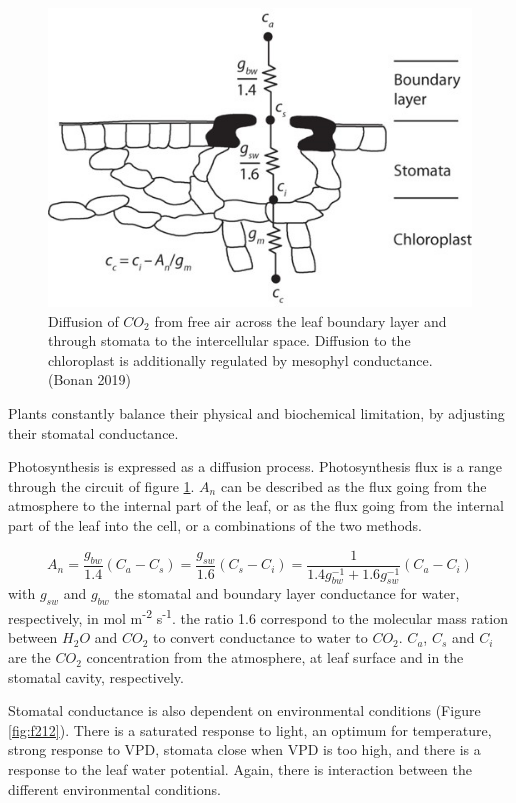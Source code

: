\documentclass[
  12pt,
  oneside]{book}
\begin{document}
\begin{figure}

{\centering \includegraphics[width=0.8\linewidth]{figures/chap2/conductance} 

}

\caption{Diffusion of $CO_2$ from free air across the leaf boundary layer and through stomata to the intercellular space. Diffusion to the chloroplast is additionally regulated by mesophyl conductance. (Bonan 2019)}\label{fig:f211}
\end{figure}

Plants constantly balance their physical and biochemical limitation, by adjusting their stomatal conductance.

Photosynthesis is expressed as a diffusion process. Photosynthesis flux is a range through the circuit of figure \ref{fig:f211}. \(A_n\) can be described as the flux going from the atmosphere to the internal part of the leaf, or as the flux going from the internal part of the leaf into the cell, or a combinations of the two methods.

\[
A_n=\frac{g_{bw}}{1.4}(C_a-C_s) = \frac{g_{sw}}{1.6}(C_s-C_i)=\frac{1}{1.4g_{bw}^{-1}+1.6g_{sw}^{-1}}(C_a-C_i)
\]
with \(g_{sw}\) and \(g_{bw}\) the stomatal and boundary layer conductance for water, respectively, in mol m\textsuperscript{-2} s\textsuperscript{-1}. the ratio 1.6 correspond to the molecular mass ration between \(H_2O\) and \(CO_2\) to convert conductance to water to \(CO_2\). \(C_a\), \(C_s\) and \(C_i\) are the \(CO_2\) concentration from the atmosphere, at leaf surface and in the stomatal cavity, respectively.

Stomatal conductance is also dependent on environmental conditions (Figure \ref{fig:f212}). There is a saturated response to light, an optimum for temperature, strong response to VPD, stomata close when VPD is too high, and there is a response to the leaf water potential. Again, there is interaction between the different environmental conditions.
\end{document}
